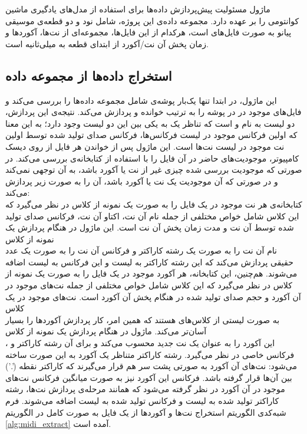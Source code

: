 ماژول
مسئولیت پیش‌پردازش داده‌ها برای استفاده از مدل‌های یادگیری ماشین کوانتومی را بر عهده دارد.
مجموعه داده‌ی این پروژه، شامل نود و دو قطعه‌ی موسیقی پیانو به صورت فایل‌های 
است، هرکدام از این فایل‌ها، مجموعه‌ای از نت‌ها، آکوردها و زمان پخش آن نت/آکورد از ابتدای قطعه به میلی‌ثانیه است.

\subsection{استخراج داده‌ها از مجموعه داده}
این ماژول، در ابتدا تنها یک‌بار پوشه‌ی شامل مجموعه داده‌ها را بررسی می‌کند و فایل‌های
موجود در در پوشه را به ترتیب خوانده و پردازش می‌کند. نتیجه‌ی این پردازش، دو لیست به نام
و
است که تناظر یک به یکی بین این دو لیست وجود دارد؛ به این معنا که اولین فرکانس موجود در لیست فرکانس‌ها، فرکانس صدای تولید شده توسط اولین نت موجود در لیست نت‌ها است.
این ماژول پس از خواندن هر فایل
از روی دیسک کامپیوتر، موجودیت‌های حاضر در آن فایل را با استفاده از کتابخانه‌ی
بررسی می‌کند. در صورتی که موجودیت بررسی شده چیزی غیر از نت یا آکورد باشد، به آن توجهی نمی‌کند و در صورتی که آن موجودیت یک نت یا آکورد باشد، آن را به صورت زیر پردازش می‌کند: \\
کتابخانه‌ی
هر نت موجود در یک فایل
را به صورت یک نمونه از کلاس
در نظر می‌گیرد که این کلاس شامل خواص مختلفی از جمله نام آن نت، اکتاو آن نت، فرکانس صدای تولید شده توسط آن نت و مدت زمان پخش آن نت است.
این ماژول در هنگام پردازش یک نمونه از کلاس \\
نام آن نت را به صورت یک رشته کاراکتر و فرکانس آن نت را به صورت یک عدد حقیقی پردازش می‌کند که این رشته کاراکتر به لیست
و این فرکانس به لیست
اضافه می‌شوند.
هم‌چنین، این کتابخانه، هر آکورد موجود در یک فایل
را به صورت یک نمونه از کلاس
در نظر می‌گیرد که این کلاس شامل خواص مختلفی از جمله نت‌های موجود در آن آکورد و حجم صدای تولید شده در هنگام پخش آن آکورد است.
نت‌های موجود در یک کلاس \\
به صورت لیستی از کلاس‌های
هستند که همین امر، کار پردازش آکوردها را بسیار آسان‌تر می‌کند.
ماژول
در هنگام پردازش یک نمونه از کلاس \\
،
این آکورد را به عنوان یک نت جدید محسوب می‌کند و برای آن رشته کاراکتر و فرکانس خاصی در نظر می‌گیرد.
رشته کاراکتر متناظر یک آکورد به این صورت ساخته می‌شود: نت‌های آن آکورد به صورتی پشت سر هم قرار می‌گیرند که کاراکتر نقطه
('.')
بین آن‌ها قرار گرفته باشد. فرکانس این آکورد نیز به صورت میانگین فرکانس نت‌های موجود در آن آکورد در نظر گرفته می‌شود که همانند مرحله‌ی پردازش نت‌ها، رشته کاراکتر تولید شده به لیست
و فرکانس تولید شده به لیست
اضافه می‌شوند.
فرم شبه‌کدی الگوریتم استخراج نت‌ها و آکوردها از یک فایل به صورت کامل در الگوریتم
\ref{alg:midi_extract}
آمده است.


